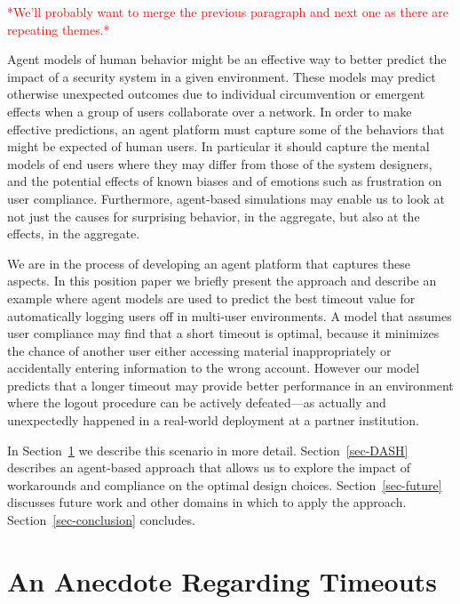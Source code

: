 \documentclass{acm_proc_article-sp}
\newcommand{\secref}[1] {Section~\ref{sec-#1}}
\begin{document}
\textcolor{red}{*We'll probably want to merge the previous paragraph and next one as there 
are repeating themes.*}

Agent models of human behavior might be an effective way to better
predict the impact of a security system in a given environment. These
models may predict otherwise unexpected outcomes due to individual
circumvention or emergent effects when a group of users collaborate
over a network. In order to make effective predictions, an agent
platform must capture some of the behaviors that might be expected of
human users. In particular it should capture the mental models of end
users where they may differ from those of the system designers, and
the potential effects of known biases and of emotions such as
frustration on user compliance.  Furthermore, agent-based simulations
may enable us to look at not just the causes for surprising behavior,
in the aggregate, but also at the effects, in the aggregate.

We are in the process of developing an agent platform that captures
these aspects. In this position paper we briefly present the approach
and describe an example where agent models are used to predict the
best timeout value for automatically logging users off in multi-user
environments.  A model that assumes user compliance may find that a
short timeout is optimal, because it minimizes the chance of another
user either accessing material inappropriately or accidentally
entering information to the wrong account. However our model predicts
that a longer timeout may provide better performance in an environment
where the logout procedure can be actively defeated---as actually and
unexpectedly happened in a real-world deployment at a partner
institution.

In \secref{timeouts} we describe this scenario in more
detail. \secref{DASH} describes an agent-based approach that allows us
to explore the impact of workarounds and compliance on the optimal
design choices. \secref{future} discusses future work and other
domains in which to apply the approach. \secref{conclusion} concludes.

\section{An Anecdote Regarding Timeouts}
\label{sec-timeouts}

\end{document}
